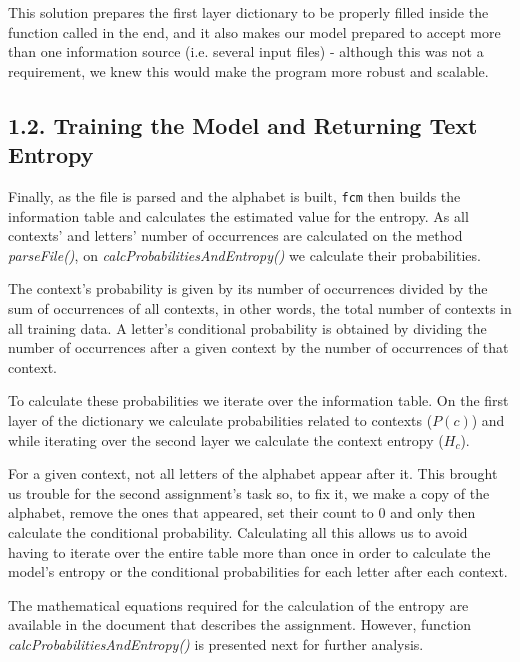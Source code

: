 \documentclass[12pt]{article}
\begin{document}
This solution prepares the first layer dictionary to be properly filled inside
the function called in the end, and it also makes our model prepared to accept 
more than one information source (i.e. several input files) - although this was 
not a requirement, we knew this would make the program more robust and scalable.

\subsection*{1.2. Training the Model and Returning Text Entropy}

Finally, as the file is parsed and the alphabet is built, \texttt{fcm} then 
builds the information table and calculates the estimated value for the entropy. 
As all contexts' and letters' number of occurrences are calculated on the
method {\it parseFile()}, on {\it calcProbabilitiesAndEntropy()} we
calculate their probabilities. 

The context's probability is given by its number of occurrences divided 
by the sum of occurrences of all contexts, in other words, the total number 
of contexts in all training data.
A letter's conditional probability is obtained by dividing the number of 
occurrences after a given context by the number of occurrences of that context.

To calculate these probabilities we iterate over the information table.
On the first layer of the dictionary we calculate probabilities related to
contexts (\(P(c)\)) and while iterating over the second layer we calculate
the context entropy (\(H_c\)). 

For a given context, not all letters of the alphabet appear after it.
This brought us trouble for the second assignment's task so, to fix it,
we make a copy of the alphabet, remove the ones that appeared, set their 
count to 0 and only then calculate the conditional probability.
Calculating all this allows us to avoid having to iterate over the entire 
table more than once in order to calculate the model's entropy or the 
conditional probabilities for each letter after each context.

\newpage
The mathematical equations required for the calculation of the entropy are 
available in the document that describes the assignment.
However, function {\it calcProbabilitiesAndEntropy()\/} is presented next 
for further analysis.
\end{document}

